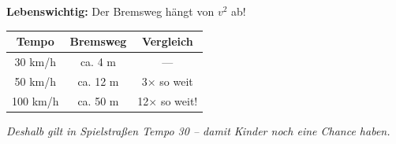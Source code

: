 \documentclass[11pt,a4paper]{article}
\begin{document}
\begin{warnung}
\textbf{Lebenswichtig:} Der Bremsweg hängt von $v^2$ ab!
\begin{center}
\begin{tabular}{|c|c|c|}
\hline
\rowcolor{lightblue}
\textbf{Tempo} & \textbf{Bremsweg} & \textbf{Vergleich} \\
\hline
30 km/h & ca. 4 m & --- \\
\hline
50 km/h & ca. 12 m & 3× so weit \\
\hline
100 km/h & ca. 50 m & 12× so weit! \\
\hline
\end{tabular}
\end{center}
\textit{Deshalb gilt in Spielstraßen Tempo 30 -- damit Kinder noch eine Chance haben.}
\end{warnung}
\end{document}
